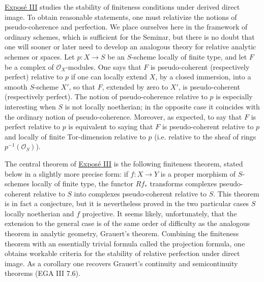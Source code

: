 \hyperlink{sga6.e03.expose}{Exposé III} studies the stability of finiteness conditions under derived direct image. To obtain reasonable statements, one must relativize the notions of pseudo-coherence and perfection. We place ourselves here in the framework of ordinary schemes, which is sufficient for the Seminar, but there is no doubt that one will sooner or later need to develop an analogous theory for relative analytic schemes or spaces. Let \(p:X\to S\) be an \(S\)-scheme locally of finite type, and let \(F\) be a complex of \(\mathcal O_X\)-modules. One says that \(F\) is pseudo-coherent (respectively perfect) relative to \(p\) if one can locally extend \(X\), by a closed immersion, into a smooth \(S\)-scheme \(X'\), so that \(F\), extended by zero to \(X'\), is pseudo-coherent (respectively perfect). The notion of pseudo-coherence relative to \(p\) is especially interesting when \(S\) is not locally noetherian; in the opposite case it coincides with the ordinary notion of pseudo-coherence. Moreover, as expected, to say that \(F\) is perfect relative to \(p\) is equivalent to saying that \(F\) is pseudo-coherent relative to \(p\) and locally of finite Tor-dimension relative to \(p\) (i.e. relative to the sheaf of rings \(p^{-1}(\mathcal O_S)\)).

The central theorem of \hyperlink{sga6.e03.expose}{Exposé III} is the following finiteness theorem, stated below in a slightly more precise form: if \(f:X\to Y\) is a proper morphism of \(S\)-schemes locally of finite type, the functor \(Rf_*\) transforms complexes pseudo-coherent relative to \(S\) into complexes pseudo-coherent relative to \(S\). This theorem is in fact a conjecture, but it is nevertheless proved in the two particular cases \(S\) locally noetherian and \(f\) projective. It seems likely, unfortunately, that the extension to the general case is of the same order of difficulty as the analogous theorem in analytic geometry, Grauert's theorem. Combining the finiteness theorem with an essentially trivial formula called the projection formula, one obtains workable criteria for the stability of relative perfection under direct image. As a corollary one recovers Grauert's continuity and semicontinuity theorems (EGA III 7.6).

